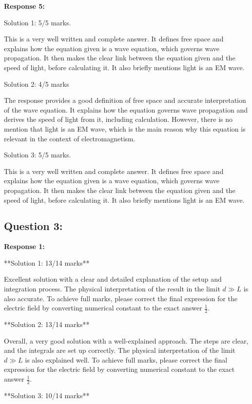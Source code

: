 \documentclass[a4paper,11pt]{article}
\begin{document}
\textbf{Response 5:}

Solution 1: 5/5 marks. 

This is a very well written and complete answer. It defines free space and explains how the equation given is a wave equation, which governs wave propagation. It then makes the clear link between the equation given and the speed of light, before calculating it. It also briefly mentions light is an EM wave.

Solution 2: 4/5 marks

The response provides a good definition of free space and accurate interpretation of the wave equation. It explains how the equation governs wave propagation and derives the speed of light from it, including calculation. However, there is no mention that light is an EM wave, which is the main reason why this equation is relevant in the context of electromagnetism.

Solution 3: 5/5 marks.

This is a very well written and complete answer. It defines free space and explains how the equation given is a wave equation, which governs wave propagation. It then makes the clear link between the equation given and the speed of light, before calculating it. It also briefly mentions light is an EM wave.

\subsection*{Question 3:}

\textbf{Response 1:}

**Solution 1: 13/14 marks**

Excellent solution with a clear and detailed explanation of the setup and integration process. The physical interpretation of the result in the limit \(d \gg L\) is also accurate. To achieve full marks, please correct the final expression for the electric field by converting numerical constant to the exact answer \(\frac{1}{2}\).

**Solution 2: 13/14 marks**

Overall, a very good solution with a well-explained approach. The steps are clear, and the integrals are set up correctly. The physical interpretation of the limit \(d \gg L\) is also explained well. To achieve full marks, please correct the final expression for the electric field by converting numerical constant to the exact answer \(\frac{1}{2}\). 

**Solution 3: 10/14 marks**
\end{document}
